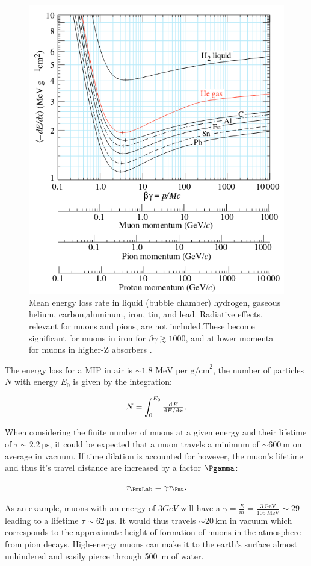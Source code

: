 \begin{figure}[htbp]
\centering
\includegraphics[width=0.7\linewidth]{./fig/BB.png}
\caption{Mean energy loss rate in liquid (bubble chamber) hydrogen, gaseous helium, carbon,aluminum, iron, tin, and lead. Radiative effects, relevant for muons and pions, are not included.These become significant for muons in iron for $\beta\gamma \gtrsim 1000$, and at lower momenta for muons in higher-Z absorbers \cite{Tanabashi:2018oca}.}
\label{fig:BB}
\end{figure}


The energy loss for a MIP in air is $\sim 1.8 \text{ MeV per g/cm}^2$, the number of particles $N$ with energy $E_0$ is given by the integration:

\begin{equation}
N=\int_0^{E_0}\od{E}{E/\text{d}x}.
\end{equation}


When considering the finite number of muons at a given energy and their lifetime of $\tau\sim\SI{2.2}{\micro\second}$, it could be expected that a muon travels a minimum of $\sim \SI{600}{\meter}$ on average in vacuum. If time dilation is accounted for however, the muon's lifetime and thus it's travel distance are increased by a factor $\Pgamma$:

\begin{equation}
\tau_{\Pmu\text{Lab}}=\gamma\tau_{\Pmu}.
\end{equation}

As an example, muons with an energy of $3 GeV$ will have a $\gamma=\frac{E}{m}=\frac{\SI{3}{\GeV}}{\SI{105}{\MeV}}\sim 29$ leading to a lifetime $\tau \sim \SI{62}{\micro\second}$. It would thus travels $\sim \SI{20}{\kilo\meter}$ in vacuum which corresponds to the approximate height of formation of muons in the atmosphere from pion decays. High-energy muons can make it to the earth's surface almost unhindered and easily pierce through \SI{500}{\meter} of water.

